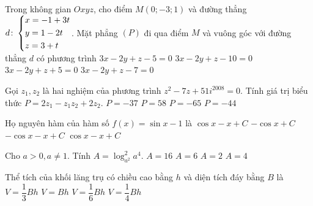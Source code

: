 \begin{ex}%
 Trong không gian $Oxyz$, cho điểm $M(0;-3;1)$ và đường thẳng $d\colon\left\{\begin{aligned}& x=-1+3t \\& y=1-2t \\& z=3+t\end{aligned}\right.$. Mặt phẳng $(P)$ đi qua điểm $M$ và vuông góc với đường thẳng $d$ có phương trình
\choice
{$3x-2y+z-5=0$}
{$3x-2y+z-10=0$}
{$3x-2y+z+5=0$}
{\True $3x-2y+z-7=0$}
\end{ex}
\begin{ex}%
 Gọi $z_1,z_2$ là hai nghiệm của phương trình $z^2-7z+51i^{2008}=0$. Tính giá trị biểu thức $P=2z_1-z_1z_2+2z_2$.
\choice
{\True $P=-37$}
{$P=58$}
{$P=-65$}
{$P=-44$}
\end{ex}
\begin{ex}%
Họ nguyên hàm của hàm số $f(x)=\sin x-1$ là
\choice
{$\cos x-x+C$}
{$-\cos x+C$}
{\True $-\cos x-x+C$}
{$\cos x-x+C$}
\end{ex}
\begin{ex}%
 Cho $a>0,a\ne 1$. Tính $A=\log^2_{a^2}a^4$.
\choice
{$A=16$}
{$A=6$}
{$A=2$}
{\True $A=4$}
\end{ex}
\begin{ex}%
 Thể tích của khối lăng trụ có chiều cao bằng $h$ và diện tích đáy bằng $B$ là
\choice
{$V=\dfrac{1}{3}Bh$}
{\True $V=Bh$}
{$V=\dfrac{1}{6}Bh$}
{$V=\dfrac{1}{4}Bh$}
\end{ex}
